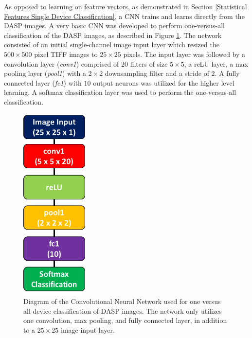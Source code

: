 As opposed to learning on feature vectors, as demonstrated in Section \ref{Statistical Features Single Device Classification}, a CNN trains and learns directly from the DASP images.  A very basic CNN was developed to perform one-versus-all classification of the DASP images, as described in Figure \ref{fig:cnn_net_single}.  The network consisted of an initial single-channel image input layer which resized the $500 \times 500$ pixel TIFF images to $25 \times 25$ pixels.  The input layer was followed by a convolution layer (\textit{conv1}) comprised of $20$ filters of size $5 \times 5$, a reLU layer, a max pooling layer (\textit{pool1}) with a $2 \times 2$ downsampling filter and a stride of $2$.  A fully connected layer (\textit{fc1}) with $10$ output neurons was utilized for the higher level learning.  A softmax classification layer was used to perform the one-versus-all classification.

\begin{figure}[htbp!]
	\includegraphics[width=0.3\textwidth,keepaspectratio]{./misc_graphics/dasp_cnn_simple_network.png}
	\centering
	\caption{Diagram of the Convolutional Neural Network used for one versus all device classification of DASP images. The network only utilizes one convolution, max pooling, and fully connected layer, in addition to a $25 \times 25$ image input layer.}
	\label{fig:cnn_net_single}
\end{figure}

